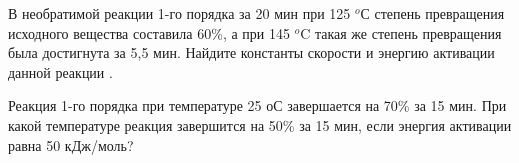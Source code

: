\begin{Task}
В необратимой реакции 1-го порядка за 20 мин при 125 $^o$С степень превращения исходного вещества составила 60\%, а при 145 $^o$C такая же степень превращения была достигнута за 5,5 мин. Найдите константы скорости и энергию активации данной реакции .
\end{Task}
\begin{Task}
Реакция 1-го порядка при температуре 25 оС завершается на 70\% за 15 мин. При какой температуре реакция завершится на 50\% за 15 мин, если энергия активации равна 50 кДж/моль?
\end{Task}
%
